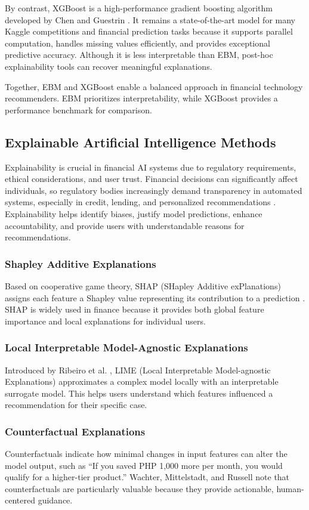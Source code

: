 \documentclass[journal]{./IEEE/IEEEtran}
\begin{document}
By contrast, XGBoost is a high-performance gradient boosting algorithm developed by Chen and Guestrin \cite{ref16}. It remains a state-of-the-art model for many Kaggle competitions and financial prediction tasks because it supports parallel computation, handles missing values efficiently, and provides exceptional predictive accuracy. Although it is less interpretable than EBM, post-hoc explainability tools can recover meaningful explanations.

Together, EBM and XGBoost enable a balanced approach in financial technology recommenders. EBM prioritizes interpretability, while XGBoost provides a performance benchmark for comparison.

\subsection{Explainable Artificial Intelligence Methods}
Explainability is crucial in financial AI systems due to regulatory requirements, ethical considerations, and user trust. Financial decisions can significantly affect individuals, so regulatory bodies increasingly demand transparency in automated systems, especially in credit, lending, and personalized recommendations \cite{ref17}. Explainability helps identify biases, justify model predictions, enhance accountability, and provide users with understandable reasons for recommendations.

\subsubsection{Shapley Additive Explanations}
Based on cooperative game theory, SHAP (SHapley Additive exPlanations) assigns each feature a Shapley value representing its contribution to a prediction \cite{ref18}. SHAP is widely used in finance because it provides both global feature importance and local explanations for individual users.

\subsubsection{Local Interpretable Model-Agnostic Explanations}
Introduced by Ribeiro et al. \cite{ref19}, LIME (Local Interpretable Model-agnostic Explanations) approximates a complex model locally with an interpretable surrogate model. This helps users understand which features influenced a recommendation for their specific case.

\subsubsection{Counterfactual Explanations}
Counterfactuals indicate how minimal changes in input features can alter the model output, such as ``If you saved PHP 1,000 more per month, you would qualify for a higher-tier product.'' Wachter, Mittelstadt, and Russell \cite{ref20} note that counterfactuals are particularly valuable because they provide actionable, human-centered guidance.
\end{document}
